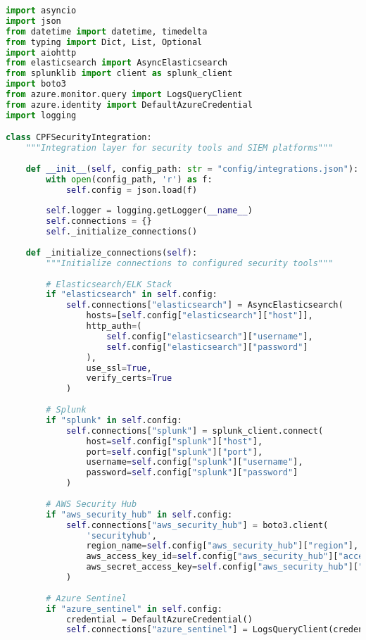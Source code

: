 \documentclass[11pt,a4paper]{article}
\begin{document}
\begin{lstlisting}[language=Python, caption=SIEM Integration Module]
import asyncio
import json
from datetime import datetime, timedelta
from typing import Dict, List, Optional
import aiohttp
from elasticsearch import AsyncElasticsearch
from splunklib import client as splunk_client
import boto3
from azure.monitor.query import LogsQueryClient
from azure.identity import DefaultAzureCredential
import logging

class CPFSecurityIntegration:
    """Integration layer for security tools and SIEM platforms"""
    
    def __init__(self, config_path: str = "config/integrations.json"):
        with open(config_path, 'r') as f:
            self.config = json.load(f)
        
        self.logger = logging.getLogger(__name__)
        self.connections = {}
        self._initialize_connections()
    
    def _initialize_connections(self):
        """Initialize connections to configured security tools"""
        
        # Elasticsearch/ELK Stack
        if "elasticsearch" in self.config:
            self.connections["elasticsearch"] = AsyncElasticsearch(
                hosts=[self.config["elasticsearch"]["host"]],
                http_auth=(
                    self.config["elasticsearch"]["username"],
                    self.config["elasticsearch"]["password"]
                ),
                use_ssl=True,
                verify_certs=True
            )
        
        # Splunk
        if "splunk" in self.config:
            self.connections["splunk"] = splunk_client.connect(
                host=self.config["splunk"]["host"],
                port=self.config["splunk"]["port"],
                username=self.config["splunk"]["username"],
                password=self.config["splunk"]["password"]
            )
        
        # AWS Security Hub
        if "aws_security_hub" in self.config:
            self.connections["aws_security_hub"] = boto3.client(
                'securityhub',
                region_name=self.config["aws_security_hub"]["region"],
                aws_access_key_id=self.config["aws_security_hub"]["access_key"],
                aws_secret_access_key=self.config["aws_security_hub"]["secret_key"]
            )
        
        # Azure Sentinel
        if "azure_sentinel" in self.config:
            credential = DefaultAzureCredential()
            self.connections["azure_sentinel"] = LogsQueryClient(credential)
        

\end{lstlisting}
\end{document}
